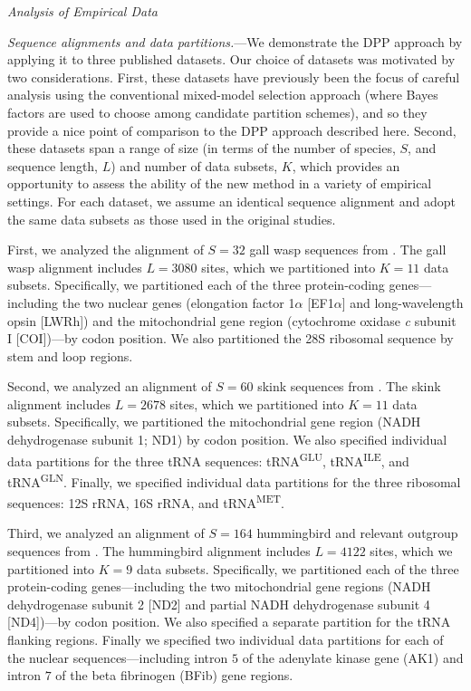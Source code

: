 \documentclass[11pt]{article}
\begin{document}
\bigskip

\newpage
\begin{center}
{\it Analysis of Empirical Data}
\end{center}
{\it Sequence alignments and data partitions.}---We demonstrate the DPP approach by applying it to three published datasets.
Our choice of datasets was motivated by two considerations.
First, these datasets have previously been the focus of careful analysis using the conventional mixed-model selection approach (where Bayes factors are used to choose among candidate partition schemes), and so they provide a nice point of comparison to the DPP approach described here.
Second, these datasets span a range of size (in terms of the number of species, $S$, and sequence length, $L$) and number of data subsets, $K$, which provides an opportunity to assess the ability of the new method in a variety of empirical settings.
For each dataset, we assume an identical sequence alignment and adopt the same data subsets as those used in the original studies.

First, we analyzed the alignment of $S = 32$ gall wasp sequences from \citet{nylander04}.  
The gall wasp alignment includes $L = 3080$ sites, which we partitioned into $K = 11$ data subsets.
Specifically, we partitioned each of the three protein-coding genes---including the two nuclear genes (elongation factor 1$\alpha$ [EF1$\alpha$] and long-wavelength opsin [LWRh]) and the mitochondrial gene region (cytochrome oxidase {\it c } subunit I [COI])---by codon position. 
We also partitioned the 28S ribosomal sequence by stem and loop regions.  

Second, we analyzed an alignment of $S = 60$ skink sequences from \citet{brandley05}.  
The skink alignment includes $L = 2678$ sites, which we partitioned into $K = 11$ data subsets.
Specifically, we partitioned the mitochondrial gene region (NADH dehydrogenase subunit 1; ND1) by codon position.
We also specified individual data partitions for the three tRNA sequences: tRNA\textsuperscript{GLU}, tRNA\textsuperscript{ILE}, and tRNA\textsuperscript{GLN}.
Finally, we specified individual data partitions for the three ribosomal sequences: 12S rRNA, 16S rRNA, and tRNA\textsuperscript{MET}.  

Third, we analyzed an alignment of $S = 164$ hummingbird and relevant outgroup sequences from \citet{mcguire07}.  
The hummingbird alignment includes $L = 4122$ sites, which we partitioned into $K = 9$ data subsets.
Specifically, we partitioned each of the three protein-coding genes---including the two mitochondrial gene regions (NADH dehydrogenase subunit 2 [ND2] and partial NADH dehydrogenase subunit 4 [ND4])---by codon position.
We also specified a separate partition for the tRNA flanking regions.
Finally we specified two individual data partitions for each of the nuclear sequences---including intron $5$ of the adenylate kinase gene (AK1) and intron $7$ of the beta fibrinogen (BFib) gene regions.  
\end{document}
